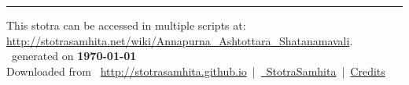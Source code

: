 \documentclass[oneside,12pt]{book}
\begin{document}
\setmainfont[Script=Devanagari,Mapping=tex-text]{Sanskrit 2003}
\fontsize {16}{19.25}\selectfont
\begin{center}

\end{center}
\vfill
\centering
\rule{0.8\textwidth}{0.6pt}

\footnotesize
{}\sffamily
This stotra can be accessed in multiple scripts at:\\
\url{http://stotrasamhita.net/wiki/Annapurna_Ashtottara_Shatanamavali}.\\[1ex]
\faFilePdfO~generated on \textbf{\today}\\[1ex]
Downloaded from \faGlobe{}~\url{http://stotrasamhita.github.io}~|~\href{https://github.com/StotraSamhita}{\faGithubSquare{}~StotraSamhita}~|~\href{https://stotrasamhita.github.io/about/}{Credits}
\end{document}
